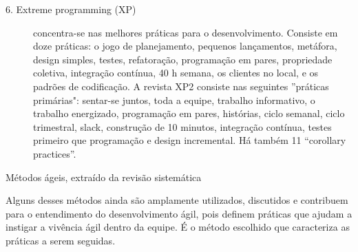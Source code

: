 \begin{description}
\item [6. Extreme programming (XP)]
concentra-se nas melhores práticas para o desenvolvimento.  Consiste em doze práticas: o jogo de planejamento, pequenos lançamentos,  metáfora, design simples, testes, refatoração, programação em pares,  propriedade coletiva, integração contínua, 40 h semana, os clientes no local,  e os padrões de codificação. A revista XP2 consiste nas seguintes  ''práticas primárias": sentar-se juntos, toda a equipe, trabalho informativo,  o trabalho energizado, programação em pares, histórias, ciclo semanal,  ciclo trimestral, slack, construção de 10 minutos, integração contínua,  testes primeiro que programação e design incremental.  Há também 11 ``corollary practices''.
\end{description}
\begin{flushright}
Métodos ágeis, extraído da revisão sistemática ~\cite{dyba2008}
\end{flushright}

Alguns desses métodos ainda são amplamente utilizados, discutidos e contribuem para o entendimento do desenvolvimento ágil, pois definem práticas que ajudam a instigar a vivência ágil dentro da equipe. É o método escolhido que caracteriza as práticas a serem seguidas.

